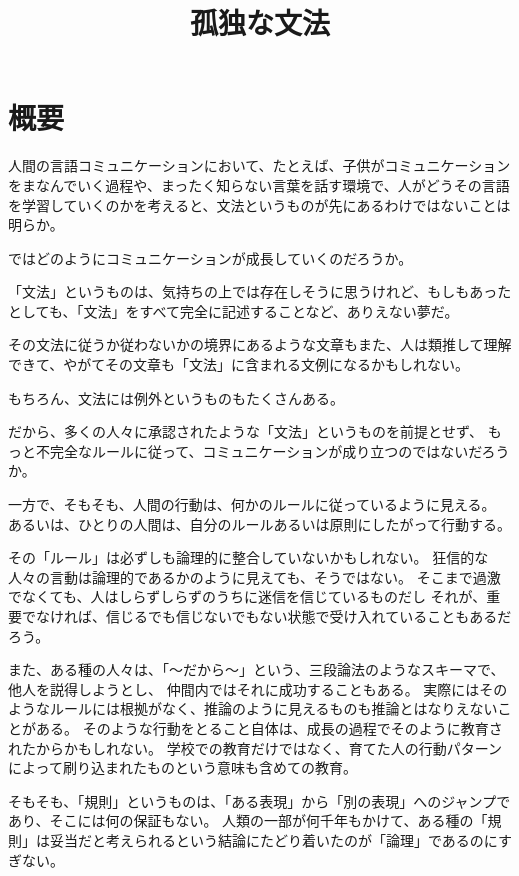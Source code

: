 \documentclass[10pt, oneside]{jarticle}   	%
\title{孤独な文法}
\author{\myname}
\begin{document}
\maketitle

\section{概要}
人間の言語コミュニケーションにおいて、たとえば、子供がコミュニケーションをまなんでいく過程や、まったく知らない言葉を話す環境で、人がどうその言語を学習していくのかを考えると、文法というものが先にあるわけではないことは明らか。

ではどのようにコミュニケーションが成長していくのだろうか。

「文法」というものは、気持ちの上では存在しそうに思うけれど、もしもあったとしても、「文法」をすべて完全に記述することなど、ありえない夢だ。

その文法に従うか従わないかの境界にあるような文章もまた、人は類推して理解できて、やがてその文章も「文法」に含まれる文例になるかもしれない。

もちろん、文法には例外というものもたくさんある。

だから、多くの人々に承認されたような「文法」というものを前提とせず、
もっと不完全なルールに従って、コミュニケーションが成り立つのではないだろうか。

一方で、そもそも、人間の行動は、何かのルールに従っているように見える。
あるいは、ひとりの人間は、自分のルールあるいは原則にしたがって行動する。

その「ルール」は必ずしも論理的に整合していないかもしれない。
狂信的な人々の言動は論理的であるかのように見えても、そうではない。
そこまで過激でなくても、人はしらずしらずのうちに迷信を信じているものだし
それが、重要でなければ、信じるでも信じないでもない状態で受け入れていることもあるだろう。

また、ある種の人々は、「〜だから〜」という、三段論法のようなスキーマで、他人を説得しようとし、
仲間内ではそれに成功することもある。
実際にはそのようなルールには根拠がなく、推論のように見えるものも推論とはなりえないことがある。
そのような行動をとること自体は、成長の過程でそのように教育されたからかもしれない。
学校での教育だけではなく、育てた人の行動パターンによって刷り込まれたものという意味も含めての教育。

そもそも、「規則」というものは、「ある表現」から「別の表現」へのジャンプであり、そこには何の保証もない。
人類の一部が何千年もかけて、ある種の「規則」は妥当だと考えられるという結論にたどり着いたのが「論理」であるのにすぎない。
\end{document}
